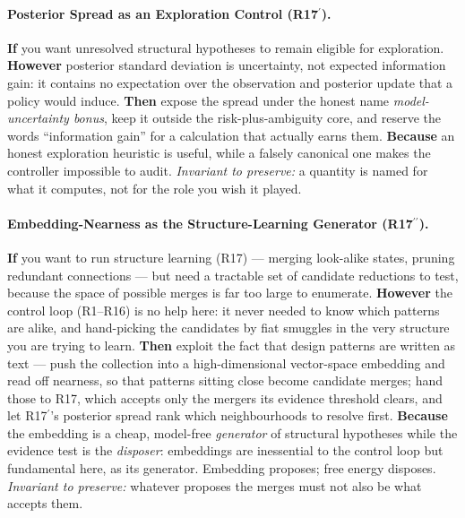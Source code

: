 \paragraph{Posterior Spread as an Exploration Control (R17\hspace{.1em}$^{\prime}$).} \textbf{If} you want unresolved structural hypotheses to remain eligible for exploration. \textbf{However} posterior standard deviation is uncertainty, not expected information gain: it contains no expectation over the observation and posterior update that a policy would induce. \textbf{Then} expose the spread under the honest name \emph{model-uncertainty bonus}, keep it outside the risk-plus-ambiguity core, and reserve the words ``information gain'' for a calculation that actually earns them. \textbf{Because} an honest exploration heuristic is useful, while a falsely canonical one makes the controller impossible to audit.  \emph{Invariant to preserve:} a quantity is named for what it computes, not for the role you wish it played.

\paragraph{Embedding-Nearness as the Structure-Learning Generator (R17\hspace{.1em}$^{\prime\prime}$).} \textbf{If} you want to run structure learning (R17) --- merging look-alike states, pruning redundant connections --- but need a tractable set of candidate reductions to test, because the space of possible merges is far too large to enumerate. \textbf{However} the control loop (R1--R16) is no help here: it never needed to know which patterns are alike, and hand-picking the candidates by fiat smuggles in the very structure you are trying to learn. \textbf{Then} exploit the fact that design patterns are written as text --- push the collection into a high-dimensional vector-space embedding and read off nearness, so that patterns sitting close become candidate merges; hand those to R17, which accepts only the mergers its evidence threshold clears, and let R17$^{\prime}$'s posterior spread rank which neighbourhoods to resolve first. \textbf{Because} the embedding is a cheap, model-free \emph{generator} of structural hypotheses while the evidence test is the \emph{disposer}: embeddings are inessential to the control loop but fundamental here, as its generator.  Embedding proposes; free energy disposes.  \emph{Invariant to preserve:} whatever proposes the merges must not also be what accepts them.


